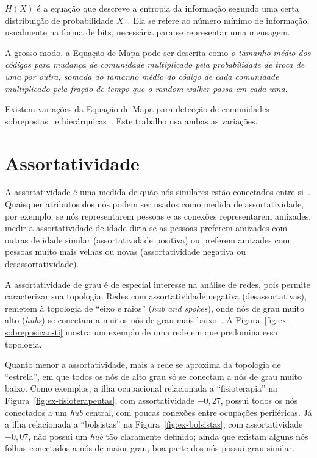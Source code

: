 \documentclass[
  article,
  11pt,
  a4paper,
  english,
  brazil,
  sumario=tradicional]{abntex2}
\begin{document}
$H(X)$ é a equação que descreve a entropia da informação segundo uma certa distribuição de probabilidade $X$~\cite{Shannon1948-ic}. Ela se refere ao número mínimo de informação, usualmente na forma de bits, necessária para se representar uma mensagem.

A grosso modo, a Equação de Mapa pode ser descrita como \textit{o tamanho médio dos códigos para mudança de comunidade multiplicado pela probabilidade de troca de uma por outra, somada ao tamanho médio do código de cada comunidade multiplicado pela fração de tempo que o \textit{random walker} passa em cada uma}.

Existem variações da Equação de Mapa para detecção de comunidades sobrepostas~\cite{Viamontes_Esquivel2011-it} e hierárquicas~\cite{Rosvall2011-yi}. Este trabalho usa ambas as variações.


\section{Assortatividade} \label{sec:assortatividade}

A assortatividade é uma medida de quão nós similares estão conectados entre si~\cite{Newman2003-jn}. Quaisquer atributos dos nós podem ser usados como medida de assortatividade, por exemplo, se nós representarem pessoas e as conexões representarem amizades, medir a assortatividade de idade diria se as pessoas preferem amizades com outras de idade similar (assortatividade positiva) ou preferem amizades com pessoas muito mais velhas ou novas (assortatividade negativa ou desassortatividade).

A assortatividade de grau é de especial interesse na análise de redes, pois permite caracterizar sua topologia. Redes com assortatividade negativa (desassortativas), remetem à topologia de \enquote{eixo e raios} (\textit{hub and spokes}), onde nós de grau muito alto (\textit{hubs}) se conectam a muitos nós de grau mais baixo~\cite{Barabasi2016-rn}. A Figura~\ref{fig:ex-sobreposicao-ti} mostra um exemplo de uma rede em que predomina essa topologia.

Quanto menor a assortatividade, mais a rede se aproxima da topologia de \enquote{estrela}, em que todos os nós de alto grau só se conectam a nós de grau muito baixo. Como exemplos, a ilha ocupacional relacionada a \enquote{fisioterapia} na Figura~\ref{fig:ex-fisioterapeutas}, com assortatividade $-0,27$, possui todos os nós conectados a um \textit{hub} central, com poucas conexões entre ocupações periféricas. Já a ilha relacionada a \enquote{bolsistas} na Figura~\ref{fig:ex-bolsistas}, com assortatividade $-0,07$, não possui um \textit{hub} tão claramente definido; ainda que existam alguns nós folhas conectados a nós de maior grau, boa parte dos nós possui grau similar.
\end{document}
